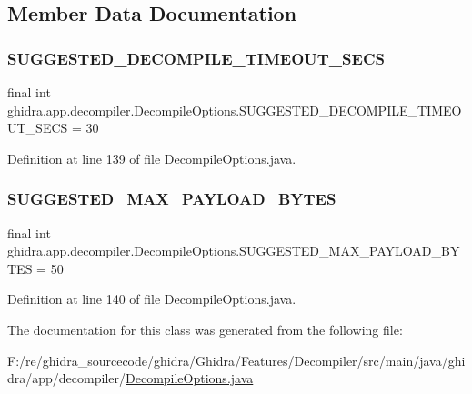 \subsection{Member Data Documentation}
\mbox{\label{classghidra_1_1app_1_1decompiler_1_1_decompile_options_aca4d1e8a516c8147ae08af51ae617f54}} 
\subsubsection{\texorpdfstring{SUGGESTED\_DECOMPILE\_TIMEOUT\_SECS}{SUGGESTED\_DECOMPILE\_TIMEOUT\_SECS}}
{\footnotesize\ttfamily final int ghidra.\+app.\+decompiler.\+Decompile\+Options.\+S\+U\+G\+G\+E\+S\+T\+E\+D\+\_\+\+D\+E\+C\+O\+M\+P\+I\+L\+E\+\_\+\+T\+I\+M\+E\+O\+U\+T\+\_\+\+S\+E\+CS = 30\hspace{0.3cm}{\ttfamily [static]}}



Definition at line 139 of file Decompile\+Options.\+java.

\mbox{\label{classghidra_1_1app_1_1decompiler_1_1_decompile_options_a5be67a14073d55e4e4fb99b6474588a0}} 
\subsubsection{\texorpdfstring{SUGGESTED\_MAX\_PAYLOAD\_BYTES}{SUGGESTED\_MAX\_PAYLOAD\_BYTES}}
{\footnotesize\ttfamily final int ghidra.\+app.\+decompiler.\+Decompile\+Options.\+S\+U\+G\+G\+E\+S\+T\+E\+D\+\_\+\+M\+A\+X\+\_\+\+P\+A\+Y\+L\+O\+A\+D\+\_\+\+B\+Y\+T\+ES = 50\hspace{0.3cm}{\ttfamily [static]}}



Definition at line 140 of file Decompile\+Options.\+java.



The documentation for this class was generated from the following file\+:\begin{DoxyCompactItemize}
\item 
F\+:/re/ghidra\+\_\+sourcecode/ghidra/\+Ghidra/\+Features/\+Decompiler/src/main/java/ghidra/app/decompiler/\mbox{\hyperlink{_decompile_options_8java}{Decompile\+Options.\+java}}\end{DoxyCompactItemize}
